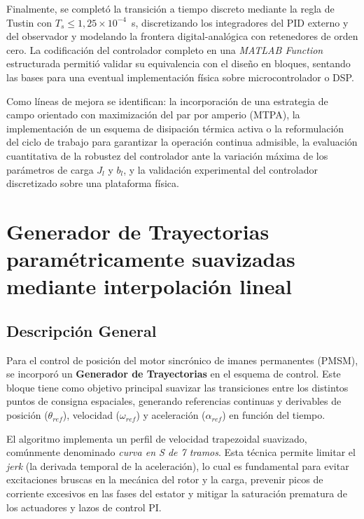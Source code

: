 \documentclass[12pt, a4paper,journal, onecolumn, compsoc]{IEEEtran}
\begin{document}
Finalmente, se completó la transición a tiempo discreto mediante la regla de Tustin con $T_s \leq 1{,}25\times 10^{-4}$~s, discretizando los integradores del PID externo y del observador y modelando la frontera digital-analógica con retenedores de orden cero. La codificación del controlador completo en una \textit{MATLAB Function} estructurada permitió validar su equivalencia con el diseño en bloques, sentando las bases para una eventual implementación física sobre microcontrolador o DSP.

Como líneas de mejora se identifican: la incorporación de una estrategia de campo orientado con maximización del par por amperio (MTPA), la implementación de un esquema de disipación térmica activa o la reformulación del ciclo de trabajo para garantizar la operación continua admisible, la evaluación cuantitativa de la robustez del controlador ante la variación máxima de los parámetros de carga $J_l$ y $b_l$, y la validación experimental del controlador discretizado sobre una plataforma física.











\appendices
\section{Generador de Trayectorias paramétricamente suavizadas mediante interpolación lineal}
\subsection{Descripción General}
Para el control de posición del motor sincrónico de imanes permanentes (PMSM), se incorporó un \textbf{Generador de Trayectorias} en el esquema de control. Este bloque tiene como objetivo principal suavizar las transiciones entre los distintos puntos de consigna espaciales, generando referencias continuas y derivables de posición ($\theta_{ref}$), velocidad ($\omega_{ref}$) y aceleración ($\alpha_{ref}$) en función del tiempo. 

El algoritmo implementa un perfil de velocidad trapezoidal suavizado, comúnmente denominado \textit{curva en S de 7 tramos}. Esta técnica permite limitar el \textit{jerk} (la derivada temporal de la aceleración), lo cual es fundamental para evitar excitaciones bruscas en la mecánica del rotor y la carga, prevenir picos de corriente excesivos en las fases del estator y mitigar la saturación prematura de los actuadores y lazos de control PI.
\end{document}
